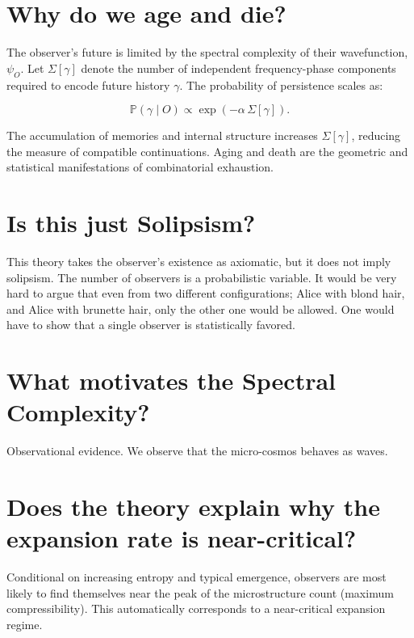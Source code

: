 \section*{Why do we age and die?}

The observer’s future is limited by the spectral complexity of their wavefunction, \(\psi_O\). Let \(\Sigma[\gamma]\) denote the number of independent frequency-phase components required to encode future history \(\gamma\).
The probability of persistence scales as:

\[
\mathbb{P}(\gamma \mid O) \propto \exp(-\alpha \, \Sigma[\gamma]).
\]

The accumulation of memories and internal structure increases \(\Sigma[\gamma]\), reducing the measure of compatible continuations.
Aging and death are the geometric and statistical manifestations of combinatorial exhaustion.


\section*{Is this just Solipsism?}

This theory takes the observer’s existence as axiomatic, but it does not imply solipsism. The number of observers is a probabilistic variable.
It would be very hard to argue that even from two different configurations; Alice with blond hair, and Alice with brunette hair,
only the other one would be allowed. One would have to show that a single observer is statistically favored.


\section*{What motivates the Spectral Complexity?}

Observational evidence. We observe that the micro-cosmos behaves as waves. 


\section*{Does the theory explain why the expansion rate is near-critical?}

Conditional on increasing entropy and typical emergence, observers are most likely to find themselves near the peak of the microstructure count (maximum compressibility).
This automatically corresponds to a near-critical expansion regime.


